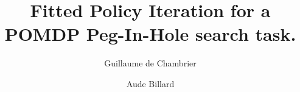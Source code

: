 \documentclass[final,5p,times,twocolumn]{elsarticle}
\begin{document}
\begin{frontmatter}



\title{Fitted Policy Iteration for a POMDP Peg-In-Hole search task.}



\author[rvt]{Guillaume de Chambrier}

\author[rvt]{Aude Billard}


\address[rvt]{Learning Algorithms and Systems Laboratory (LASA), \'Ecole Polytechnique F\'ed\'erale de Lausanne (EPFL), Switzerland}

\address{}





\end{frontmatter}
\end{document}

